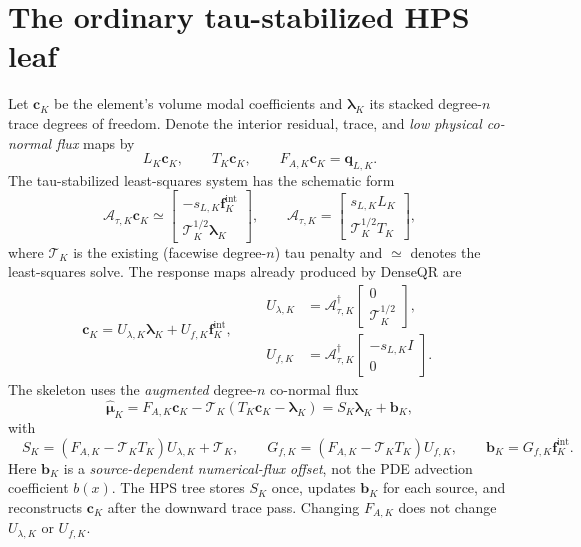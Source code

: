 \documentclass[11pt,letterpaper]{article}
\newcommand{\Tau}{\mathcal T}
\newcommand{\lam}{\boldsymbol\lambda}
\newcommand{\muh}{\widehat{\boldsymbol\mu}}
\newcommand{\fint}{\mathbf f^{\mathrm{int}}}
\newcommand{\bb}{\mathbf b}
\newcommand{\cc}{\mathbf c}
\begin{document}
\section{The ordinary tau-stabilized HPS leaf}
Let \(\cc_K\) be the element's volume modal coefficients and \(\lam_K\) its stacked degree-\(n\) trace degrees of freedom. Denote the interior residual, trace, and \emph{low physical co-normal flux} maps by
\begin{equation}
 L_K\cc_K,\qquad T_K\cc_K,\qquad F_{A,K}\cc_K=\mathbf q_{L,K}.
\end{equation}
The tau-stabilized least-squares system has the schematic form
\begin{equation}\label{eq:stack}
 \mathcal A_{\tau,K}\cc_K \simeq
 \begin{bmatrix}-s_{L,K}\fint_K\\ \Tau_K^{1/2}\lam_K\end{bmatrix},\qquad
 \mathcal A_{\tau,K}=
 \begin{bmatrix}s_{L,K}L_K\\ \Tau_K^{1/2}T_K\end{bmatrix},
\end{equation}
where \(\Tau_K\) is the existing (facewise degree-\(n\)) tau penalty and \(\simeq\) denotes the least-squares solve. The response maps already produced by DenseQR are
\begin{equation}\label{eq:U}
 \cc_K=U_{\lambda,K}\lam_K+U_{f,K}\fint_K,\qquad
 \begin{aligned}
 U_{\lambda,K}&=\mathcal A_{\tau,K}^{\dagger}
       \begin{bmatrix}0\\\Tau_K^{1/2}\end{bmatrix},\\
 U_{f,K}&=\mathcal A_{\tau,K}^{\dagger}
       \begin{bmatrix}-s_{L,K}I\\0\end{bmatrix}.
 \end{aligned}
\end{equation}
The skeleton uses the \emph{augmented} degree-\(n\) co-normal flux
\begin{equation}\label{eq:augflux}
 \muh_K=F_{A,K}\cc_K-\Tau_K(T_K\cc_K-\lam_K)
       =S_K\lam_K+\bb_K,
\end{equation}
with
\begin{equation}\label{eq:Sleaf}
 \boxed{\quad
 S_K=(F_{A,K}-\Tau_KT_K)U_{\lambda,K}+\Tau_K,\qquad
 G_{f,K}=(F_{A,K}-\Tau_KT_K)U_{f,K},\qquad
 \bb_K=G_{f,K}\fint_K.\quad}
\end{equation}
Here \(\bb_K\) is a \emph{source-dependent numerical-flux offset}, not the PDE advection coefficient \(b(x)\). The HPS tree stores \(S_K\) once, updates \(\bb_K\) for each source, and reconstructs \(\cc_K\) after the downward trace pass. Changing \(F_{A,K}\) does not change \(U_{\lambda,K}\) or \(U_{f,K}\).
\end{document}
